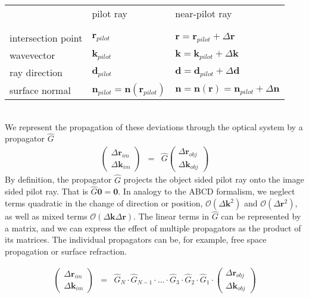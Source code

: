 \documentclass[12pt,a4paper,twoside,openright,BCOR10mm,headsepline,titlepage,abstracton,chapterprefix,final]{scrreprt}
\newcommand\Vector[1]{{\mathbf{#1}}}
\newcommand\wavenumber{k}
\newcommand\Wavevector{\Vector{\wavenumber}}
\newcommand{\orderof}[1]{\mathcal{O}(#1)}
\begin{document}
\begin{tabular}{ l | l | l }
		    & pilot ray & near-pilot ray \\
& & \\ \hline & & \\
intersection point  & $\Vector{r}_{pilot}$ & ${\Vector{r}} = \Vector{r}_{pilot} + \Delta\Vector{r}$ \\
wavevector  & $\Wavevector_{pilot}$ & ${\Wavevector} = \Wavevector_{pilot} + \Delta\Wavevector$ \\
ray direction  & $\Vector{d}_{pilot}$ & ${\Vector{d}} = \Vector{d}_{pilot} + \Delta\Vector{d}$ \\
surface normal      & $\Vector{n}_{pilot} = \Vector{n}(\Vector{r}_{pilot})$ & ${\Vector{n}} = \Vector{n}({\Vector{r}}) = \Vector{n}_{pilot} + \Delta\Vector{n}$ \\
\end{tabular}\\[2ex]
We represent the propagation of these deviations through the optical system by a propagator $\hat{G}$
\begin{eqnarray}
 \begin{pmatrix}
  \Delta \Vector{r}_{im} \\ \Delta \Wavevector_{im}
 \end{pmatrix}
 &=&
 \hat{G}
 \begin{pmatrix}
  \Delta \Vector{r}_{obj} \\ \Delta \Wavevector_{obj}
 \end{pmatrix}
\end{eqnarray}
By definition, the propagator $\hat{G}$ projects the object sided pilot ray onto the image sided pilot ray.
That is $\hat{G}\Vector{0} = \Vector{0}$.
In analogy to the ABCD formalism, we neglect terms quadratic in the change of direction or position, 
$\orderof{\Delta\Wavevector^2}$ and $\orderof{\Delta\Vector{r}^2}$, as well as mixed terms $\orderof{\Delta\Wavevector\Delta\Vector{r}}$.
The linear terms in $\hat{G}$ can be represented by a matrix,
and we can express the effect of multiple propagators as the product of its matrices.
The individual propagators can be, for example, free space propagation or surface refraction.

\begin{eqnarray}
 \begin{pmatrix}
  \Delta \Vector{r}_{im} \\ \Delta \Wavevector_{im}
 \end{pmatrix}
 &=&
 \hat{G}_N \cdot \hat{G}_{N-1} \cdot ... \cdot \hat{G}_3 \cdot \hat{G}_2 \cdot \hat{G}_1 \cdot
 \begin{pmatrix}
  \Delta \Vector{r}_{obj} \\ \Delta \Wavevector_{obj}
 \end{pmatrix}
\end{eqnarray}
\end{document}
